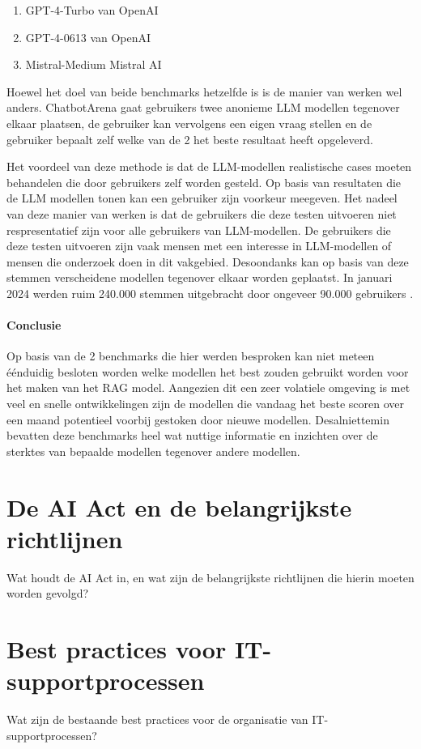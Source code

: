     \begin{enumerate}
        \item GPT-4-Turbo van OpenAI
        \item GPT-4-0613 van OpenAI
        \item Mistral-Medium Mistral AI
    \end{enumerate}
    
    Hoewel het doel van beide benchmarks hetzelfde is is de manier van werken wel anders. ChatbotArena gaat gebruikers twee anonieme LLM modellen tegenover elkaar plaatsen, de gebruiker kan vervolgens een eigen vraag stellen en de gebruiker bepaalt zelf welke van de 2 het beste resultaat heeft opgeleverd.
    
    Het voordeel van deze methode is dat de LLM-modellen realistische cases moeten behandelen die door gebruikers zelf worden gesteld. Op basis van resultaten die de LLM modellen tonen kan een gebruiker zijn voorkeur meegeven. Het nadeel van deze manier van werken is dat de gebruikers die deze testen uitvoeren niet respresentatief zijn voor alle gebruikers van LLM-modellen. De gebruikers die deze testen uitvoeren zijn vaak mensen met een interesse in LLM-modellen of mensen die onderzoek doen in dit vakgebied. Desoondanks kan op basis van deze stemmen verscheidene modellen tegenover elkaar worden geplaatst. In januari 2024 werden ruim 240.000 stemmen uitgebracht door ongeveer 90.000 gebruikers \autocite{Chiang2024}. 
    
    
    \paragraph{Conclusie}
    Op basis van de 2 benchmarks die hier werden besproken kan niet meteen éénduidig besloten worden welke modellen het best zouden gebruikt worden voor het maken van het RAG model. Aangezien dit een zeer volatiele omgeving is met veel en snelle ontwikkelingen zijn de modellen die vandaag het beste scoren over een maand potentieel voorbij gestoken door nieuwe modellen. Desalniettemin bevatten deze benchmarks heel wat nuttige informatie en inzichten over de sterktes van bepaalde modellen tegenover andere modellen. 
    

\section{De AI Act en de belangrijkste richtlijnen}
Wat houdt de AI Act in, en wat zijn de belangrijkste richtlijnen die hierin moeten worden gevolgd?

\section{Best practices voor IT-supportprocessen}
Wat zijn de bestaande best practices voor de organisatie van IT-supportprocessen?
